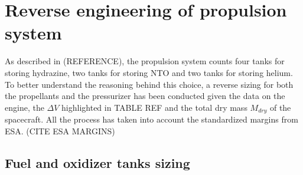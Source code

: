 \section{Reverse engineering of propulsion system}
\label{sec:reverse_prop}

As described in (REFERENCE), the propulsion system counts four tanks for storing hydrazine, two tanks for storing NTO and two tanks for storing helium.
To better understand the reasoning behind this choice, a reverse sizing for both the propellants and the pressurizer has been conducted given the data on the engine, the $\Delta V$ highlighted in TABLE REF and the total dry mass $M_{dry}$ of the spacecraft.
All the process has taken into account the standardized margins from ESA. (CITE ESA MARGINS)

\subsection{Fuel and oxidizer tanks sizing}
\label{subsec:fuel_ox_sizing}

